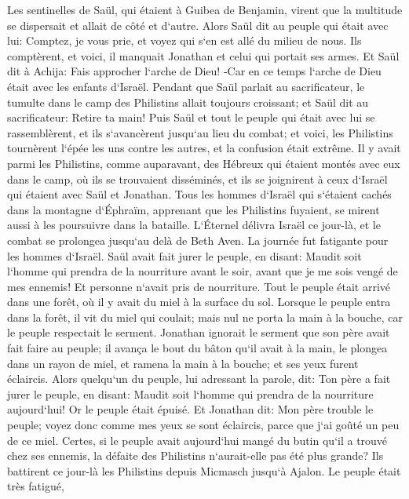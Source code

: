 \verse Les sentinelles de Saül, qui étaient à Guibea de Benjamin, virent que la multitude se dispersait et allait de côté et d`autre. 
\verse Alors Saül dit au peuple qui était avec lui: Comptez, je vous prie, et voyez qui s`en est allé du milieu de nous. Ils comptèrent, et voici, il manquait Jonathan et celui qui portait ses armes. 
\verse Et Saül dit à Achija: Fais approcher l`arche de Dieu! -Car en ce temps l`arche de Dieu était avec les enfants d`Israël. 
\verse Pendant que Saül parlait au sacrificateur, le tumulte dans le camp des Philistins allait toujours croissant; et Saül dit au sacrificateur: Retire ta main! 
\verse Puis Saül et tout le peuple qui était avec lui se rassemblèrent, et ils s`avancèrent jusqu`au lieu du combat; et voici, les Philistins tournèrent l`épée les uns contre les autres, et la confusion était extrême. 
\verse Il y avait parmi les Philistins, comme auparavant, des Hébreux qui étaient montés avec eux dans le camp, où ils se trouvaient disséminés, et ils se joignirent à ceux d`Israël qui étaient avec Saül et Jonathan. 
\verse Tous les hommes d`Israël qui s`étaient cachés dans la montagne d`Éphraïm, apprenant que les Philistins fuyaient, se mirent aussi à les poursuivre dans la bataille. 
\verse L`Éternel délivra Israël ce jour-là, et le combat se prolongea jusqu`au delà de Beth Aven. 
\verse La journée fut fatigante pour les hommes d`Israël. Saül avait fait jurer le peuple, en disant: Maudit soit l`homme qui prendra de la nourriture avant le soir, avant que je me sois vengé de mes ennemis! Et personne n`avait pris de nourriture. 
\verse Tout le peuple était arrivé dans une forêt, où il y avait du miel à la surface du sol. 
\verse Lorsque le peuple entra dans la forêt, il vit du miel qui coulait; mais nul ne porta la main à la bouche, car le peuple respectait le serment. 
\verse Jonathan ignorait le serment que son père avait fait faire au peuple; il avança le bout du bâton qu`il avait à la main, le plongea dans un rayon de miel, et ramena la main à la bouche; et ses yeux furent éclaircis. 
\verse Alors quelqu`un du peuple, lui adressant la parole, dit: Ton père a fait jurer le peuple, en disant: Maudit soit l`homme qui prendra de la nourriture aujourd`hui! Or le peuple était épuisé. 
\verse Et Jonathan dit: Mon père trouble le peuple; voyez donc comme mes yeux se sont éclaircis, parce que j`ai goûté un peu de ce miel. 
\verse Certes, si le peuple avait aujourd`hui mangé du butin qu`il a trouvé chez ses ennemis, la défaite des Philistins n`aurait-elle pas été plus grande? 
\verse Ils battirent ce jour-là les Philistins depuis Micmasch jusqu`à Ajalon. Le peuple était très fatigué, 
